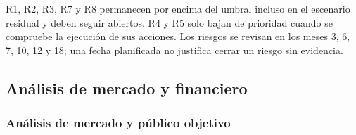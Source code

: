 R1, R2, R3, R7 y R8 permanecen por encima del umbral incluso en el escenario residual y deben seguir abiertos. R4 y R5 solo bajan de prioridad cuando se compruebe la ejecución de sus acciones. Los riesgos se revisan en los meses 3, 6, 7, 10, 12 y 18; una fecha planificada no justifica cerrar un riesgo sin evidencia.

\subsection{Análisis de mercado y financiero}




\subsubsection{Análisis de mercado y público objetivo}




